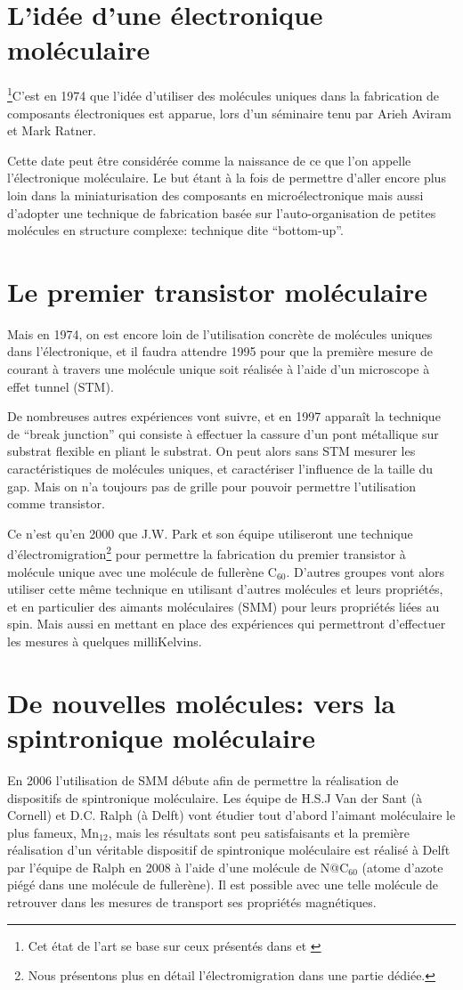 \section{L'idée d'une électronique moléculaire}
\footnote{Cet état de l'art se base sur ceux présentés dans \cite{3} et \cite{4}}C'est en 1974 que l'idée d'utiliser des molécules uniques dans la fabrication de composants électroniques est apparue, lors d'un séminaire tenu par Arieh Aviram et Mark Ratner.

Cette date peut être considérée comme la naissance de ce que l'on appelle l'électronique moléculaire.
Le but étant à la fois de permettre d'aller encore plus loin dans la miniaturisation des composants en microélectronique mais aussi d'adopter une technique de fabrication basée sur l'auto-organisation de petites molécules en structure complexe: technique dite “bottom-up”.
\section{Le premier transistor moléculaire}
Mais en 1974, on est encore loin de l'utilisation concrète de molécules uniques dans l'électronique, et il faudra attendre 1995 pour que la première mesure de courant à travers une molécule unique soit réalisée à l'aide d'un microscope à effet tunnel (STM).

De nombreuses autres expériences vont suivre, et en 1997 apparaît la technique de “break junction” qui consiste à effectuer la cassure d'un pont métallique sur substrat flexible en pliant le substrat. On peut alors sans STM mesurer les caractéristiques de molécules uniques, et caractériser l'influence de la taille du gap. Mais on n'a toujours pas de grille pour pouvoir permettre l'utilisation comme transistor.

Ce n'est qu'en 2000 que J.W. Park et son équipe utiliseront une technique d'électromigration\footnote{Nous présentons plus en détail l'électromigration dans une partie dédiée.} pour permettre la fabrication du premier transistor à molécule unique avec une molécule de fullerène C$_{60}$. D'autres groupes vont alors utiliser cette même technique en utilisant d'autres molécules et leurs propriétés, et en particulier des aimants moléculaires (SMM) pour leurs propriétés liées au spin. Mais aussi en mettant en place des expériences qui permettront d'effectuer les mesures à quelques milliKelvins.

\section{De nouvelles molécules: vers la spintronique moléculaire}
En 2006 l'utilisation de SMM débute afin de permettre la réalisation de dispositifs de spintronique moléculaire. Les équipe de H.S.J Van der Sant (à Cornell) et D.C. Ralph (à Delft) vont étudier tout d'abord l'aimant moléculaire le plus fameux, Mn$_{12}$, mais les résultats sont peu satisfaisants et la première réalisation d'un véritable dispositif de spintronique moléculaire est réalisé à Delft par l'équipe de Ralph en 2008 à l'aide d'une molécule de N@C$_{60}$ (atome d'azote piégé dans une molécule de fullerène). Il est possible avec une telle molécule de retrouver dans les mesures de transport ses propriétés magnétiques.\medskip 

